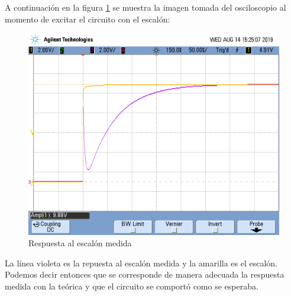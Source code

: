 

A continuación en la figura \ref{rtaalescalonosciloscopio} se muestra la imagen tomada del osciloscopio al momento de excitar el circuito con el escalón:

\begin{figure}[H]                                                       
    \centering\includegraphics[width=\textwidth]{resources/rtaalescalon.png}
    \caption{Respuesta al escalón medida}
\label{rtaalescalonosciloscopio}
\end{figure}

La línea violeta es la repuesta al escalón  medida y la amarilla es el escalón. Podemos decir entonces  que se corresponde de manera adecuada la respuesta medida con la teórica y que el circuito se comportó como se esperaba.
 
%